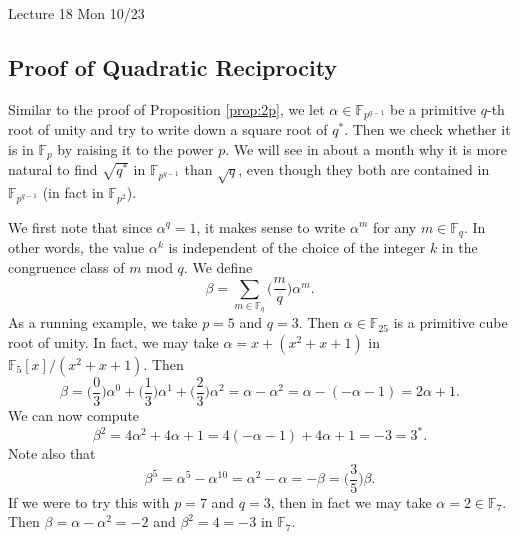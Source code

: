 \documentclass{article}
\def\F{{\mathbb F}}
\def\F{{\mathbb F}}
\newcommand{\add}[1]{{\color{blue} #1}}
\renewcommand{\lg}[2]{\Big(\frac{#1}{#2}\Big)}
\begin{document}
\begin{center}
    \add{Lecture 18 Mon 10/23}
\end{center}

\subsection*{Proof of Quadratic Reciprocity}
Similar to the proof of Proposition \ref{prop:2p}, we let $\alpha\in\F_{p^{q-1}}$ be a primitive $q$-th root of unity and try to write down a square root of $q^*$. Then we check whether it is in $\F_p$ by raising it to the power $p$. We will see in about a month why it is more natural to find $\sqrt{q^*}$ in $\F_{p^{q-1}}$ than $\sqrt{q}$, even though they both are contained in $\F_{p^{q-1}}$ (in fact in $\F_{p^2}$). 

We first note that since $\alpha^q = 1$, it makes sense to write $\alpha^m$ for any $m\in\F_q$. In other words, the value $\alpha^k$ is independent of the choice of the integer $k$ in the congruence class of $m$ mod $q$. We define
$$\beta = \sum_{m\in\F_q} \lg{m}{q}\alpha^m.$$
As a running example, we take $p = 5$ and $q = 3$. Then $\alpha\in\F_{25}$ is a primitive cube root of unity. In fact, we may take $\alpha = x + (x^2 + x + 1)$ in $\F_5[x]/(x^2 + x + 1).$ Then
$$\beta = \lg{0}{3}\alpha^0 + \lg{1}{3}\alpha^1 + \lg{2}{3}\alpha^2 = \alpha - \alpha^2 = \alpha - (-\alpha - 1) = 2\alpha + 1.$$
We can now compute $$\beta^2 = 4\alpha^2 + 4\alpha + 1 = 4(-\alpha-1) + 4\alpha + 1 = -3 = 3^*.$$
Note also that
$$\beta^5 = \alpha^5 - \alpha^{10} = \alpha^2 - \alpha = -\beta = \lg{3}{5}\beta.$$
If we were to try this with $p = 7$ and $q = 3$, then in fact we may take $\alpha = 2 \in\F_7.$ Then $\beta = \alpha - \alpha^2 = -2$ and $\beta^2 = 4 = -3$ in $\F_7$.
\end{document}
